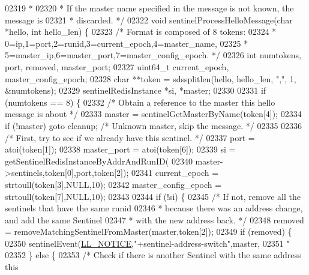 \begin{DoxyCode}
{{{{{{{{{{{{{{{{{{{{{{{{{{{{{{{{{{{{{{{{{{{{{{{{02319 \textcolor{comment}{ *}
02320 \textcolor{comment}{ * If the master name specified in the message is not known, the message is}
02321 \textcolor{comment}{ * discarded. */}
02322 \textcolor{keywordtype}{void} sentinelProcessHelloMessage(\textcolor{keywordtype}{char} *hello, \textcolor{keywordtype}{int} hello\_len) \{
02323     \textcolor{comment}{/* Format is composed of 8 tokens:}
02324 \textcolor{comment}{     * 0=ip,1=port,2=runid,3=current\_epoch,4=master\_name,}
02325 \textcolor{comment}{     * 5=master\_ip,6=master\_port,7=master\_config\_epoch. */}
02326     \textcolor{keywordtype}{int} numtokens, port, removed, master\_port;
02327     uint64\_t current\_epoch, master\_config\_epoch;
02328     \textcolor{keywordtype}{char} **token = sdssplitlen(hello, hello\_len, \textcolor{stringliteral}{","}, 1, &numtokens);
02329     sentinelRedisInstance *si, *master;
02330 
02331     \textcolor{keywordflow}{if} (numtokens == 8) \{
02332         \textcolor{comment}{/* Obtain a reference to the master this hello message is about */}
02333         master = sentinelGetMasterByName(token[4]);
02334         \textcolor{keywordflow}{if} (!master) \textcolor{keywordflow}{goto} cleanup; \textcolor{comment}{/* Unknown master, skip the message. */}
02335 
02336         \textcolor{comment}{/* First, try to see if we already have this sentinel. */}
02337         port = atoi(token[1]);
02338         master\_port = atoi(token[6]);
02339         si = getSentinelRedisInstanceByAddrAndRunID(
02340                         master->sentinels,token[0],port,token[2]);
02341         current\_epoch = strtoull(token[3],NULL,10);
02342         master\_config\_epoch = strtoull(token[7],NULL,10);
02343 
02344         \textcolor{keywordflow}{if} (!si) \{
02345             \textcolor{comment}{/* If not, remove all the sentinels that have the same runid}
02346 \textcolor{comment}{             * because there was an address change, and add the same Sentinel}
02347 \textcolor{comment}{             * with the new address back. */}
02348             removed = removeMatchingSentinelFromMaster(master,token[2]);
02349             \textcolor{keywordflow}{if} (removed) \{
02350                 sentinelEvent(\hyperlink{server_8h_a8c54c191e436c7dd3012167212692401}{LL\_NOTICE},\textcolor{stringliteral}{"+sentinel-address-switch"},master,
02351                     \textcolor{stringliteral}{"%
02352             \} \textcolor{keywordflow}{else} \{
02353                 \textcolor{comment}{/* Check if there is another Sentinel with the same address this}
}}}}}}}}}}}}}}}}}}}}}}}}}}}}}}}}}}}}}}}}}}}}}}}}}
\end{DoxyCode}
